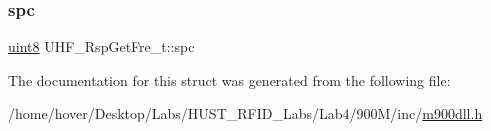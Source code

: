 \mbox{\label{struct_u_h_f___rsp_get_fre__t_a8b2aa758e0dfc2ef9abef3f95e005eac}} 
\subsubsection{\texorpdfstring{spc}{spc}}
{\footnotesize\ttfamily \mbox{\hyperlink{m900dll_8h_adde6aaee8457bee49c2a92621fe22b79}{uint8}} U\+H\+F\+\_\+\+Rsp\+Get\+Fre\+\_\+t\+::spc}



The documentation for this struct was generated from the following file\+:\begin{DoxyCompactItemize}
\item 
/home/hover/\+Desktop/\+Labs/\+H\+U\+S\+T\+\_\+\+R\+F\+I\+D\+\_\+\+Labs/\+Lab4/900\+M/inc/\mbox{\hyperlink{m900dll_8h}{m900dll.\+h}}\end{DoxyCompactItemize}
